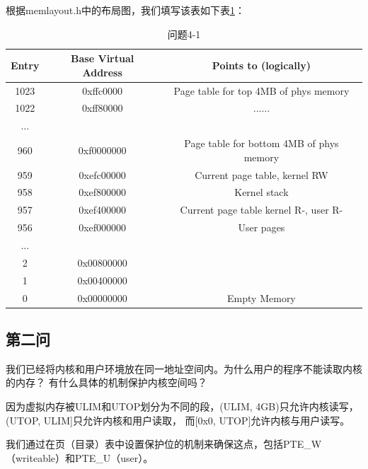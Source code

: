 \documentclass[12pt,a4paper,UTF8]{article}
\begin{document}
    根据memlayout.h中的布局图，我们填写该表如下表\ref{tab::table2}：
    \begin{table}[htbp]
        \begin{center}
            \begin{tabular}{c c c}
                \toprule
                Entry & Base Virtual Address & Points to (logically) \\
                \midrule
                1023    &   0xffc0000   &   Page table for top 4MB of phys memory \\
                1022    &   0xff80000   &   ...... \\
                ...     &               &    \\
                960     &   0xf0000000	&	Page table for bottom 4MB of phys memory \\
                959     &   0xefc00000	&	Current page table, kernel RW \\
                958     &   0xef800000	&	Kernel stack \\
                957     &   0xef400000  &   Current page table kernel R-, user R- \\
                956	    &   0xef000000  &	User pages \\
                ...     &               &    \\
                2       &   0x00800000  &    \\
                1       &   0x00400000  &    \\
                0       &   0x00000000  &   Empty Memory \\
                \bottomrule
            \end{tabular}
            \caption{问题4-1}\label{tab::table2}
        \end{center}
    \end{table}

    \subsection{第二问}
    我们已经将内核和用户环境放在同一地址空间内。为什么用户的程序不能读取内核的内存？
    有什么具体的机制保护内核空间吗？
    
    因为虚拟内存被ULIM和UTOP划分为不同的段，(ULIM, 4GB)只允许内核读写，(UTOP, ULIM]只允许内核和用户读取，
    而[0x0, UTOP]允许内核与用户读写。

    我们通过在页（目录）表中设置保护位的机制来确保这点，包括PTE\_W（writeable）和PTE\_U（user）。
\end{document}
